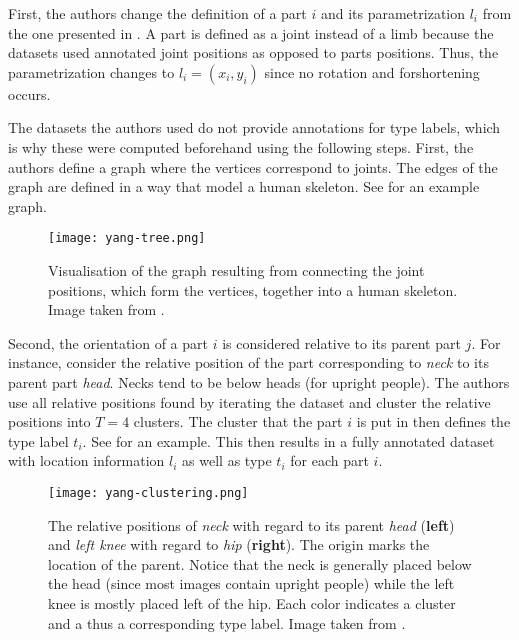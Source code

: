First, the authors change the definition of a part $i$ and its parametrization $l_i$ from the one presented in \cite{felzenszwalb_pictorial_2005}.
A part is defined as a joint instead of a limb because the datasets used annotated joint positions as opposed to parts positions.
Thus, the parametrization changes to $l_i = (x_i, y_i)$ since no rotation and forshortening occurs.

The datasets the authors used do not provide annotations for type labels, which is why these were computed beforehand using the following steps.
First, the authors define a graph where the vertices correspond to joints.
The edges of the graph are defined in a way that model a human skeleton.
See  for an example graph.

\begin{figure}[htb!]
    \centering
    \texttt{[image: yang-tree.png]}
    \caption{Visualisation of the graph resulting from connecting the joint positions, which form the vertices, together into a human skeleton. Image taken from \cite{yang_articulated_2011}.}
    \label{fig:yang-tree}
\end{figure}

Second, the orientation of a part $i$ is considered relative to its parent part $j$.
For instance, consider the relative position of the part corresponding to \textit{neck} to its parent part \textit{head}.
Necks tend to be below heads (for upright people).
The authors use all relative positions found by iterating the dataset and cluster the relative positions into $T=4$ clusters.
The cluster that the part $i$ is put in then defines the type label $t_i$.
See  for an example.
This then results in a fully annotated dataset with location information $l_i$ as well as type $t_i$ for each part $i$.

\begin{figure}[htb!]
    \centering
    \texttt{[image: yang-clustering.png]}
    \caption{The relative positions of \textit{neck} with regard to     its parent \textit{head} (\textbf{left}) and \textit{left knee} with regard to \textit{hip} (\textbf{right}). The origin marks the location of the parent. Notice that the neck is generally placed below the head (since most images contain upright people) while the left knee is mostly placed left of the hip. Each color indicates a cluster and a thus a corresponding type label. Image taken from \cite{yang_articulated_2011}.}
    \label{fig:yang-clustering}
\end{figure}

